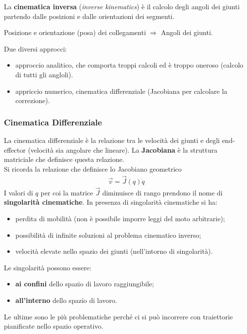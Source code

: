 \documentclass[a4paper,portrait,12pt]{article}
\theoremstyle{definition}
\begin{document}
La \textbf{cinematica inversa} (\emph{inverse kinematics}) è il calcolo degli angoli dei giunti partendo dalle posizioni e dalle orientazioni dei segmenti.
\begin{center}
Posizione e orientazione (posa) dei collegamenti $\Rightarrow$ Angoli dei giunti.
\end{center}

Due diversi approcci:
\begin{itemize}
\item approccio analitico, che comporta troppi calcoli ed è troppo oneroso (calcolo di tutti gli angloli).
\item appriccio numerico, cinematica differenziale (Jacobiana per calcolare la correzione).
\end{itemize}

\subsubsection{Cinematica Differenziale}

La cinematica differenziale è la relazione tra le velocità dei giunti e degli end-effector (velocità sia angolare che lineare).
La \textbf{Jacobiana} è la struttura matriciale che definisce questa relazione.\\

Si ricorda la relazione che definisce lo Jacobiano geometrico
\begin{align*}
\vec{v} = \vec{J}(q)\dot{q}
\end{align*}
I valori di $q$ per coi la matrice $\vec{J}$ diminuisce di rango prendono il nome di \textbf{singolarità cinematiche}.
In presenza di singolarità cinematiche si ha:
\begin{itemize}
\item perdita di mobilità (non è possibile imporre leggi del moto arbitrarie);
\item possibilità di infinite soluzioni al problema cinematico inverso;
\item velocità elevate nello spazio dei giunti (nell'intorno di singolarità).
\end{itemize}

Le singolarità possono essere:
\begin{itemize}
\item \textbf{ai confini} dello spazio di lavoro raggiungibile;
\item \textbf{all'interno} dello spazio di lavoro.
\end{itemize}
Le ultime sono le più problematiche perché ci si può incorrere con traiettorie pianificate nello spazio operativo.\\
\end{document}
